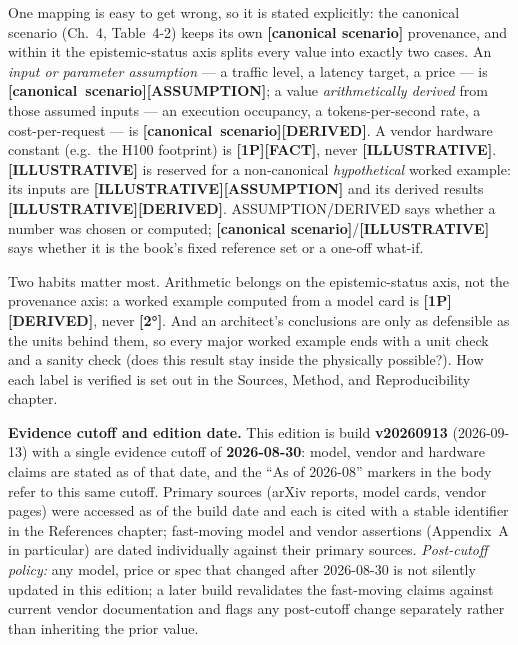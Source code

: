 One mapping is easy to get wrong, so it is stated explicitly: the canonical
scenario (Ch.~4, Table~4-2) keeps its own \textbf{[canonical scenario]}
provenance, and within it the epistemic-status axis splits every value into
exactly two cases. An \emph{input or parameter assumption} --- a traffic
level, a latency target, a price --- is
\textbf{\mbox{[canonical scenario]}\hspace{0pt}\mbox{[ASSUMPTION]}}; a value
\emph{arithmetically derived} from those
assumed inputs --- an execution occupancy, a tokens-per-second rate, a
cost-per-request --- is
\textbf{\mbox{[canonical scenario]}\hspace{0pt}\mbox{[DERIVED]}}. A vendor hardware constant (e.g.\ the H100 footprint) is
\textbf{[1P][FACT]}, never \textbf{[ILLUSTRATIVE]}. \textbf{[ILLUSTRATIVE]}
is reserved for a non-canonical \emph{hypothetical} worked example: its
inputs are \textbf{[ILLUSTRATIVE][ASSUMPTION]} and its derived results
\textbf{[ILLUSTRATIVE][DERIVED]}. ASSUMPTION/DERIVED says whether a number
was chosen or computed; \textbf{[canonical scenario]}/\textbf{[ILLUSTRATIVE]}
says whether it is the book's fixed reference set or a one-off what-if.

Two habits matter most. Arithmetic belongs on the epistemic-status axis, not
the provenance axis: a worked example computed from a model card is
\textbf{[1P][DERIVED]}, never \textbf{[2°]}. And an architect's conclusions
are only as defensible as the units behind them, so every major worked
example ends with a unit check and a sanity check (does this result stay
inside the physically possible?). How each label is verified is set out in
the Sources, Method, and Reproducibility chapter.

\textbf{Evidence cutoff and edition date.} This edition is build
\textbf{v20260913} (2026-09-13) with a single evidence cutoff of
\textbf{2026-08-30}: model, vendor and hardware claims are stated as of that
date, and the ``As of 2026-08'' markers in the body refer to this same
cutoff. Primary sources (arXiv reports, model cards, vendor pages) were
accessed as of the build date and each is cited with a stable identifier in
the References chapter; fast-moving model and vendor assertions (Appendix~A
in particular) are dated individually against their primary sources.
\emph{Post-cutoff policy:} any model, price or spec that changed after
2026-08-30 is not silently updated in this edition; a later build revalidates
the fast-moving claims against current vendor documentation and flags any
post-cutoff change separately rather than inheriting the prior value.

